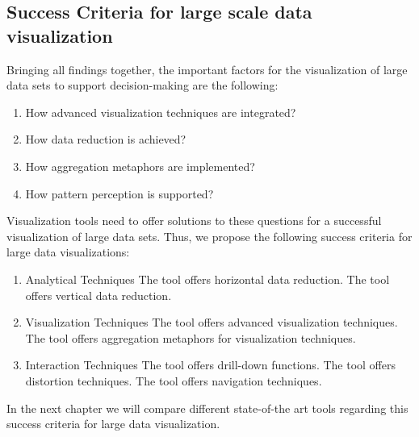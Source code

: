 \subsection{Success Criteria for large scale data visualization}
Bringing all findings together, the important factors for the visualization of large data sets to support decision-making are the following: 
\begin{enumerate}
\item How advanced visualization techniques are integrated? 
\item How data reduction is achieved? 
\item How aggregation metaphors are implemented? 
\item How pattern perception is supported? 
\end{enumerate}

Visualization tools need to offer solutions to these questions for a successful visualization of large data sets. Thus, we propose the following success criteria for large data visualizations: 
\begin{enumerate}
\item Analytical Techniques
\subitem The tool offers horizontal data reduction.
\subitem The tool offers vertical data reduction.
\item Visualization Techniques
\subitem The tool offers advanced visualization techniques.
\subitem The tool offers aggregation metaphors for visualization techniques.
\item Interaction Techniques
\subitem The tool offers drill-down functions.
\subitem The tool offers distortion techniques.
\subitem The tool offers navigation techniques.
\end{enumerate}

In the next chapter we will compare different state-of-the art tools regarding this success criteria for large data visualization.
